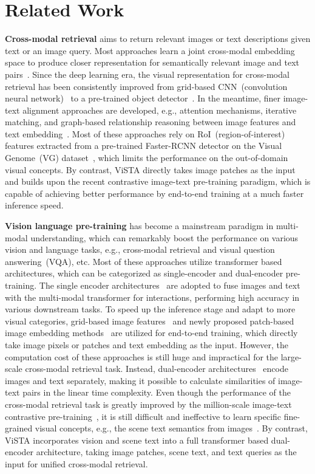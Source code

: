 \documentclass[10pt,twocolumn,letterpaper]{article}
\begin{document}
\section{Related Work}
\noindent \textbf{Cross-modal retrieval}
aims to return relevant images or text descriptions given text or an image query. Most approaches learn a joint cross-modal embedding space to produce closer representation for semantically relevant image and text pairs~\cite{Skip-Gram, frome2013devise, faghri2017vse++}. Since the deep learning era, the visual representation for cross-modal retrieval has been consistently improved from grid-based CNN~(convolution neural network)~\cite{faghri2017vse++} to a pre-trained object detector~\cite{SCAN, VSRN}. In the meantime, finer image-text alignment approaches are developed, e.g., attention mechanisms, iterative matching, and graph-based relationship reasoning between image features and text embedding~\cite{SCAN, VSRN, IMRAM, GSMN, SGRAF}. Most of these approaches rely on RoI~(region-of-interest) features extracted from a pre-trained Faster-RCNN detector on the Visual Genome~(VG) dataset~\cite{VG_dataset}, which limits the performance on the out-of-domain visual concepts. By contrast, ViSTA directly takes image patches as the input and builds upon the recent contrastive image-text pre-training paradigm, which is capable of achieving better performance by end-to-end training at a much faster inference speed.


\noindent \textbf{Vision language pre-training}
has become a mainstream paradigm in multi-modal understanding, which can remarkably boost the performance on various vision and language tasks, e.g., cross-modal retrieval and visual question answering~(VQA), etc. Most of these approaches utilize transformer based architectures, which can be categorized as single-encoder and dual-encoder pre-training. The single encoder architectures~\cite{vilbert, vl-betr, imagebert, tan2019lxmert, unicoder, UNITER, oscar, ERNIE-ViL, vinvl, Pixel-BERT, SOHO, ViLT, xue2021probing} are adopted to fuse images and text with the multi-modal transformer for interactions, performing high accuracy in various downstream tasks. To speed up the inference stage and adapt to more visual categories, grid-based image features~\cite{Pixel-BERT, SOHO} and newly proposed patch-based image embedding methods~\cite{ViLT, xue2021probing, albef} are utilized for end-to-end training, which directly take image pixels or patches and text embedding as the input. However, the computation cost of these approaches is still huge and impractical for the large-scale cross-modal retrieval task. Instead, dual-encoder architectures~\cite{CLIP,ALIGN,wenlan} encode images and text separately, making it possible to calculate similarities of image-text pairs in the linear time complexity. Even though the performance of the cross-modal retrieval task is greatly improved by the million-scale image-text contrastive pre-training~\cite{CLIP}, it is still difficult and ineffective to learn specific fine-grained visual concepts, e.g., the scene text semantics from images~\cite{CLIP}. By contrast, ViSTA incorporates vision and scene text into a full transformer based dual-encoder architecture, taking image patches, scene text, and text queries as the input for unified cross-modal retrieval.
\end{document}
